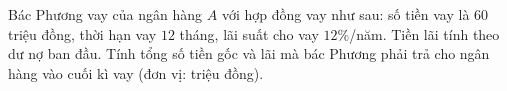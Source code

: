 \begin{ex}
Bác Phương vay của ngân hàng $A$ với hợp đồng vay như sau: số tiền vay là $60$ triệu đồng, thời hạn vay $12$ tháng, lãi suất cho vay $12\%$/năm. Tiền lãi tính theo dư nợ ban đầu. Tính tổng số tiền gốc và lãi mà bác Phương phải trả cho ngân hàng vào cuối kì vay (đơn vị: triệu đồng).
\end{ex}
